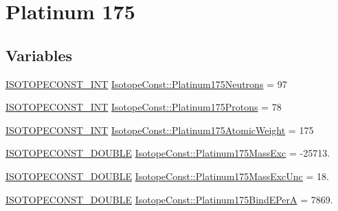 \hypertarget{group___isotope_const-_platinum-_pt175}{}\section{Platinum 175}
\label{group___isotope_const-_platinum-_pt175}
\subsection*{Variables}
\begin{DoxyCompactItemize}
\item 
\mbox{\hyperlink{group___isotope_const-_macros_ga5f18360b3e99483a35c32d789e62621c}{I\+S\+O\+T\+O\+P\+E\+C\+O\+N\+S\+T\+\_\+\+I\+NT}} \mbox{\hyperlink{group___isotope_const-_platinum-_pt175_ga496b82701af74c0e3d898491b6d155cf}{Isotope\+Const\+::\+Platinum175\+Neutrons}} = 97
\item 
\mbox{\hyperlink{group___isotope_const-_macros_ga5f18360b3e99483a35c32d789e62621c}{I\+S\+O\+T\+O\+P\+E\+C\+O\+N\+S\+T\+\_\+\+I\+NT}} \mbox{\hyperlink{group___isotope_const-_platinum-_pt175_ga83ec312afa85a711090d5ef1ac3552c4}{Isotope\+Const\+::\+Platinum175\+Protons}} = 78
\item 
\mbox{\hyperlink{group___isotope_const-_macros_ga5f18360b3e99483a35c32d789e62621c}{I\+S\+O\+T\+O\+P\+E\+C\+O\+N\+S\+T\+\_\+\+I\+NT}} \mbox{\hyperlink{group___isotope_const-_platinum-_pt175_ga21e1991a0e7128717ecff60009bc4b38}{Isotope\+Const\+::\+Platinum175\+Atomic\+Weight}} = 175
\item 
\mbox{\hyperlink{group___isotope_const-_macros_ga8f45a7272ce02c0b4c65c44636ed719a}{I\+S\+O\+T\+O\+P\+E\+C\+O\+N\+S\+T\+\_\+\+D\+O\+U\+B\+LE}} \mbox{\hyperlink{group___isotope_const-_platinum-_pt175_ga0d008d732a6f93af9bc8bbce94d65a4e}{Isotope\+Const\+::\+Platinum175\+Mass\+Exc}} = -\/25713.
\item 
\mbox{\hyperlink{group___isotope_const-_macros_ga8f45a7272ce02c0b4c65c44636ed719a}{I\+S\+O\+T\+O\+P\+E\+C\+O\+N\+S\+T\+\_\+\+D\+O\+U\+B\+LE}} \mbox{\hyperlink{group___isotope_const-_platinum-_pt175_ga43a35c84ea98b8b3656f7dee6b037954}{Isotope\+Const\+::\+Platinum175\+Mass\+Exc\+Unc}} = 18.
\item 
\mbox{\hyperlink{group___isotope_const-_macros_ga8f45a7272ce02c0b4c65c44636ed719a}{I\+S\+O\+T\+O\+P\+E\+C\+O\+N\+S\+T\+\_\+\+D\+O\+U\+B\+LE}} \mbox{\hyperlink{group___isotope_const-_platinum-_pt175_gaf7a4fdd6d28d850669cf88a4a30219b7}{Isotope\+Const\+::\+Platinum175\+Bind\+E\+PerA}} = 7869.
\item 

\end{DoxyCompactItemize}

